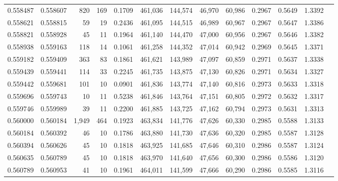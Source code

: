 \begin{tabular}{rrrrrrrrrrrrr}
0.558487 & 0.558607 &   820 & 169 &                                     0.1709 & 461,036 & 144,574 &  46,970 &  60,986 & 0.2967 & 0.5649 & 1.3392 \\
0.558621 & 0.558815 &    59 &  19 &                                     0.2436 & 461,095 & 144,515 &  46,989 &  60,967 & 0.2967 & 0.5647 & 1.3386 \\
0.558821 & 0.558928 &    45 &  11 &                                     0.1964 & 461,140 & 144,470 &  47,000 &  60,956 & 0.2967 & 0.5646 & 1.3382 \\
0.558938 & 0.559163 &   118 &  14 &                                     0.1061 & 461,258 & 144,352 &  47,014 &  60,942 & 0.2969 & 0.5645 & 1.3371 \\
0.559182 & 0.559409 &   363 &  83 &                                     0.1861 & 461,621 & 143,989 &  47,097 &  60,859 & 0.2971 & 0.5637 & 1.3338 \\
0.559439 & 0.559441 &   114 &  33 &                                     0.2245 & 461,735 & 143,875 &  47,130 &  60,826 & 0.2971 & 0.5634 & 1.3327 \\
0.559442 & 0.559681 &   101 &  10 &                                     0.0901 & 461,836 & 143,774 &  47,140 &  60,816 & 0.2973 & 0.5633 & 1.3318 \\
0.559696 & 0.559743 &    10 &  11 &                                     0.5238 & 461,846 & 143,764 &  47,151 &  60,805 & 0.2972 & 0.5632 & 1.3317 \\
0.559746 & 0.559989 &    39 &  11 &                                     0.2200 & 461,885 & 143,725 &  47,162 &  60,794 & 0.2973 & 0.5631 & 1.3313 \\
0.560000 & 0.560184 & 1,949 & 464 &                                     0.1923 & 463,834 & 141,776 &  47,626 &  60,330 & 0.2985 & 0.5588 & 1.3133 \\
0.560184 & 0.560392 &    46 &  10 &                                     0.1786 & 463,880 & 141,730 &  47,636 &  60,320 & 0.2985 & 0.5587 & 1.3128 \\
0.560394 & 0.560626 &    45 &  10 &                                     0.1818 & 463,925 & 141,685 &  47,646 &  60,310 & 0.2986 & 0.5587 & 1.3124 \\
0.560635 & 0.560789 &    45 &  10 &                                     0.1818 & 463,970 & 141,640 &  47,656 &  60,300 & 0.2986 & 0.5586 & 1.3120 \\
0.560789 & 0.560953 &    41 &  10 &                                     0.1961 & 464,011 & 141,599 &  47,666 &  60,290 & 0.2986 & 0.5585 & 1.3116 \\

\end{tabular}
